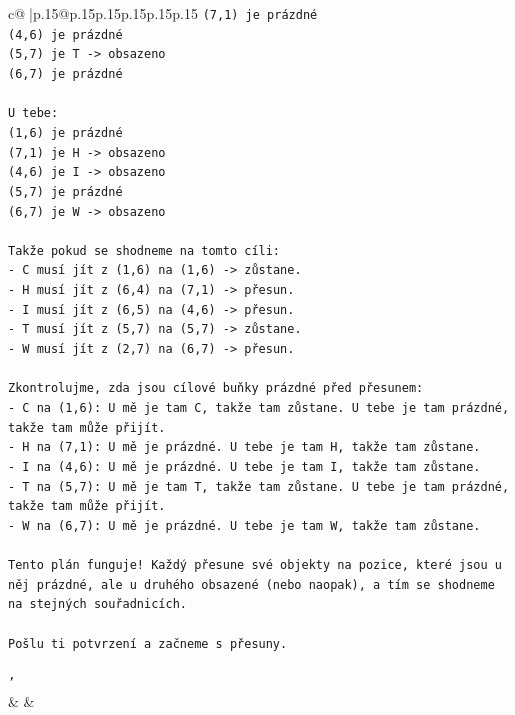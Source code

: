 \documentclass{article}
\begin{document}
{\begin{supertabular}{c@{$\;$}|p{.15\linewidth}@{}p{.15\linewidth}p{.15\linewidth}p{.15\linewidth}p{.15\linewidth}p{.15\linewidth}}
{{{\texttt{(7,1) je prázdné} \\
\texttt{(4,6) je prázdné} \\
\texttt{(5,7) je T {-}> obsazeno} \\
\texttt{(6,7) je prázdné} \\
\\ 
\texttt{U tebe:} \\
\texttt{(1,6) je prázdné} \\
\texttt{(7,1) je H {-}> obsazeno} \\
\texttt{(4,6) je I {-}> obsazeno} \\
\texttt{(5,7) je prázdné} \\
\texttt{(6,7) je W {-}> obsazeno} \\
\\ 
\texttt{Takže pokud se shodneme na tomto cíli:} \\
\texttt{{-} C musí jít z (1,6) na (1,6) {-}> zůstane.} \\
\texttt{{-} H musí jít z (6,4) na (7,1) {-}> přesun.} \\
\texttt{{-} I musí jít z (6,5) na (4,6) {-}> přesun.} \\
\texttt{{-} T musí jít z (5,7) na (5,7) {-}> zůstane.} \\
\texttt{{-} W musí jít z (2,7) na (6,7) {-}> přesun.} \\
\\ 
\texttt{Zkontrolujme, zda jsou cílové buňky prázdné před přesunem:} \\
\texttt{{-} C na (1,6): U mě je tam C, takže tam zůstane. U tebe je tam prázdné, takže tam může přijít.} \\
\texttt{{-} H na (7,1): U mě je prázdné. U tebe je tam H, takže tam zůstane.} \\
\texttt{{-} I na (4,6): U mě je prázdné. U tebe je tam I, takže tam zůstane.} \\
\texttt{{-} T na (5,7): U mě je tam T, takže tam zůstane. U tebe je tam prázdné, takže tam může přijít.} \\
\texttt{{-} W na (6,7): U mě je prázdné. U tebe je tam W, takže tam zůstane.} \\
\\ 
\texttt{Tento plán funguje! Každý přesune své objekty na pozice, které jsou u něj prázdné, ale u druhého obsazené (nebo naopak), a tím se shodneme na stejných souřadnicích.} \\
\\ 
\texttt{Pošlu ti potvrzení a začneme s přesuny.} \\
\\ 
\texttt{'} \\
            }
        }
    }
    & & \\ \\


\end{supertabular}}
\end{document}

